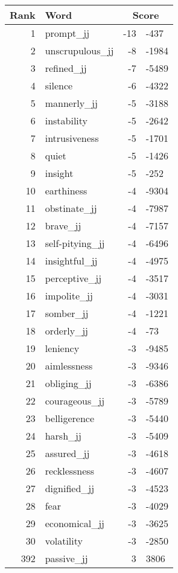 \begin{longtable}[!htbp]{| rlr@{.}l |}
    \hline
    \textbf{Rank} & \textbf{Word} & \multicolumn{2}{c|}{\textbf{Score}} \\
    \hline
    \endhead
    1 & prompt\_jj & -13 & -437 \\
    2 & unscrupulous\_jj & -8 & -1984 \\
    3 & refined\_jj & -7 & -5489 \\
    4 & silence & -6 & -4322 \\
    5 & mannerly\_jj & -5 & -3188 \\
    6 & instability & -5 & -2642 \\
    7 & intrusiveness & -5 & -1701 \\
    8 & quiet & -5 & -1426 \\
    9 & insight & -5 & -252 \\
    10 & earthiness & -4 & -9304 \\
    11 & obstinate\_jj & -4 & -7987 \\
    12 & brave\_jj & -4 & -7157 \\
    13 & self-pitying\_jj & -4 & -6496 \\
    14 & insightful\_jj & -4 & -4975 \\
    15 & perceptive\_jj & -4 & -3517 \\
    16 & impolite\_jj & -4 & -3031 \\
    17 & somber\_jj & -4 & -1221 \\
    18 & orderly\_jj & -4 & -73 \\
    19 & leniency & -3 & -9485 \\
    20 & aimlessness & -3 & -9346 \\
    21 & obliging\_jj & -3 & -6386 \\
    22 & courageous\_jj & -3 & -5789 \\
    23 & belligerence & -3 & -5440 \\
    24 & harsh\_jj & -3 & -5409 \\
    25 & assured\_jj & -3 & -4618 \\
    26 & recklessness & -3 & -4607 \\
    27 & dignified\_jj & -3 & -4523 \\
    28 & fear & -3 & -4029 \\
    29 & economical\_jj & -3 & -3625 \\
    30 & volatility & -3 & -2850 \\
    392 & passive\_jj & 3 & 3806 \\

\end{longtable}
